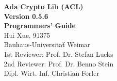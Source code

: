\documentclass[a4paper, 11pt, parskip=half]{report}
\begin{document}
	\renewcommand{\familydefault}{\sfdefault}
	\normalfont
	\linespread {1.2}\selectfont
	\begin{titlepage}
		\vspace*{12em}
		\linespread {3}\selectfont
		\center\textbf{\huge Ada Crypto Lib (ACL)\\ Version 0.5.6\\
		 Programmers' Guide}\\
		\linespread {1.66}\selectfont
		\vspace{5em}
		\large
		Hui Xue, 91375\\
		Bauhaus-Universita\"t Weimar\\
		\vspace{5em}
		1st Reviewer: Prof. Dr. Stefan Lucks\\
		2nd Reviewer: Prof. Dr. Benno Stein\\
		\quad Dipl.-Wirt.-Inf. Christian Forler
	\end{titlepage}
\pagebreak
\tableofcontents



%
%

%
%
%
%
%
%
%
%
%
%
%
%
%
%
%
%
%
%
%



\end{document}
